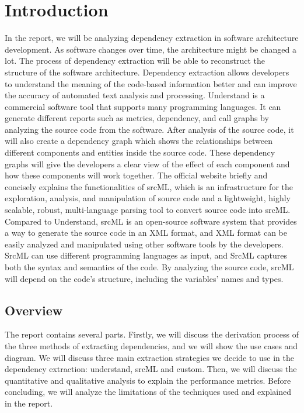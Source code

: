 \documentclass[12pt, dvipsnames, a4paper]{article}
\begin{document}
\section{Introduction}
In the report, we will be analyzing dependency extraction in software architecture development. As software changes over time, the architecture might be changed a lot. The process of dependency extraction will be able to reconstruct the structure of the software architecture. Dependency extraction allows developers to understand the meaning of the code-based information better and can improve the accuracy of automated text analysis and processing.
Understand is a commercial software tool that supports many programming languages. It can generate different reports such as metrics, dependency, and call graphs by analyzing the source code from the software. After analysis of the source code, it will also create a dependency graph which shows the relationships between different components and entities inside the source code. These dependency graphs will give the developers a clear view of the effect of each component and how these components will work together.
The official website briefly and concisely explains the functionalities of srcML, which is an infrastructure for the exploration, analysis, and manipulation of source code and a lightweight, highly scalable, robust, multi-language parsing tool to convert source code into srcML. Compared to Understand, srcML is an open-source software system that provides a way to generate the source code in an XML format, and XML format can be easily analyzed and manipulated using other software tools by the developers. SrcML can use different programming languages as input, and SrcML captures both the syntax and semantics of the code. By analyzing the source code, srcML will depend on the code's structure, including the variables' names and types.

\subsection{Overview}
The report contains several parts. Firstly, we will discuss the derivation process of the three methods of extracting dependencies, and we will show the use cases and diagram. We will discuss three main extraction strategies we decide to use in the dependency extraction: understand, srcML and custom. Then, we will discuss the quantitative and qualitative analysis to explain the performance metrics. Before concluding, we will analyze the limitations of the techniques used and explained in the report.
\end{document}
